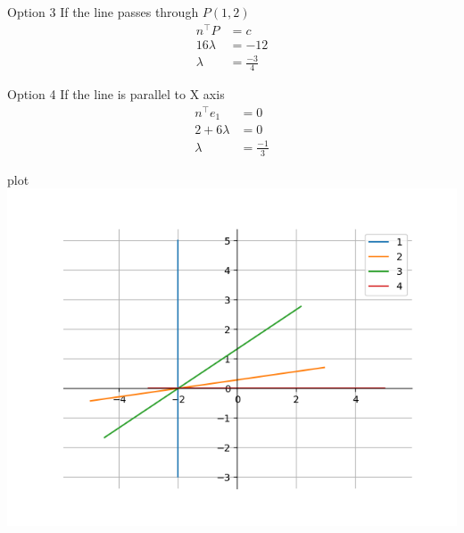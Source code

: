 \documentclass{beamer}
\begin{document}
\begin{frame}{Option 3}
If the line passes through $P(1,2)$
\begin{align}
  n^\top P &= c \\
  16\lambda &= -12 \\
  \lambda &= \frac{-3}{4}
\end{align}
\end{frame}
\begin{frame}{Option 4}
If the line is parallel to X axis
\begin{align}
n^\top e_1 &=0 \\
2+6\lambda &= 0 \\
\lambda &= \frac{-1}{3}
\end{align}
\end{frame}
\begin{frame}{plot}
\centering
    \includegraphics[width=\columnwidth, height=0.8\textheight, keepaspectratio]{../figs/fig.png}     
\end{frame}
\end{document}

